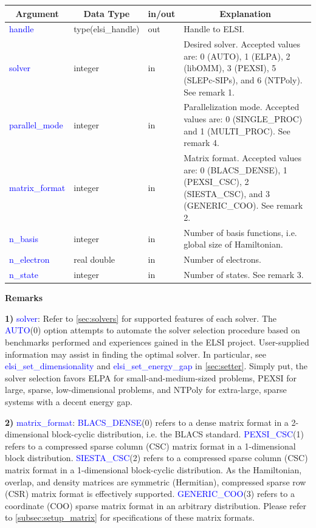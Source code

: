 \documentclass{report}
\begin{document}
\begin{tabular}[]{|p{30mm}|p{30mm}|p{15mm}|p{90mm}|}
\hline
\multicolumn{1}{|c|}{\textbf{Argument}} & \multicolumn{1}{c|}{\textbf{Data Type}} & \multicolumn{1}{c|}{\textbf{in/out}} & \multicolumn{1}{c|}{\textbf{Explanation}}\\
\hline
\textcolor{blue}{handle}         & type(elsi\_handle) & out & Handle to ELSI.\\
\hline
\textcolor{blue}{solver}         & integer            & in  & Desired solver.  Accepted values are:  0 (AUTO), 1 (ELPA), 2 (libOMM), 3 (PEXSI), 5 (SLEPc-SIPs), and 6 (NTPoly).  See remark 1.\\
\hline
\textcolor{blue}{parallel\_mode} & integer            & in  & Parallelization mode.  Accepted values are:  0 (SINGLE\_PROC) and 1 (MULTI\_PROC).  See remark 4.\\
\hline
\textcolor{blue}{matrix\_format} & integer            & in  & Matrix format.  Accepted values are:  0 (BLACS\_DENSE), 1 (PEXSI\_CSC), 2 (SIESTA\_CSC), and 3 (GENERIC\_COO).  See remark 2.\\
\hline
\textcolor{blue}{n\_basis}       & integer            & in  & Number of basis functions, i.e. global size of Hamiltonian.\\
\hline
\textcolor{blue}{n\_electron}    & real double        & in  & Number of electrons.\\
\hline
\textcolor{blue}{n\_state}       & integer            & in  & Number of states.  See remark 3.\\
\hline
\end{tabular}

\textbf{Remarks}

\textbf{1)} \textcolor{blue}{solver}:  Refer to \ref{sec:solvers} for supported features of each solver.  The \textcolor{blue}{AUTO}(0) option attempts to automate the solver selection procedure based on benchmarks performed and experiences gained in the ELSI project.  User-supplied information may assist in finding the optimal solver.  In particular, see \textcolor{blue}{elsi\_set\_dimensionality} and \textcolor{blue}{elsi\_set\_energy\_gap} in \ref{sec:setter}.  Simply put, the solver selection favors ELPA for small-and-medium-sized problems, PEXSI for large, sparse, low-dimensional problems, and NTPoly for extra-large, sparse systems with a decent energy gap.

\textbf{2)} \textcolor{blue}{matrix\_format}:  \textcolor{blue}{BLACS\_DENSE}(0) refers to a dense matrix format in a 2-dimensional block-cyclic distribution, i.e. the BLACS standard.  \textcolor{blue}{PEXSI\_CSC}(1) refers to a compressed sparse column (CSC) matrix format in a 1-dimensional block distribution.  \textcolor{blue}{SIESTA\_CSC}(2) refers to a compressed sparse column (CSC) matrix format in a 1-dimensional block-cyclic distribution.  As the Hamiltonian, overlap, and density matrices are symmetric (Hermitian), compressed sparse row (CSR) matrix format is effectively supported.  \textcolor{blue}{GENERIC\_COO}(3) refers to a coordinate (COO) sparse matrix format in an arbitrary distribution.  Please refer to \ref{subsec:setup_matrix} for specifications of these matrix formats.
\end{document}
